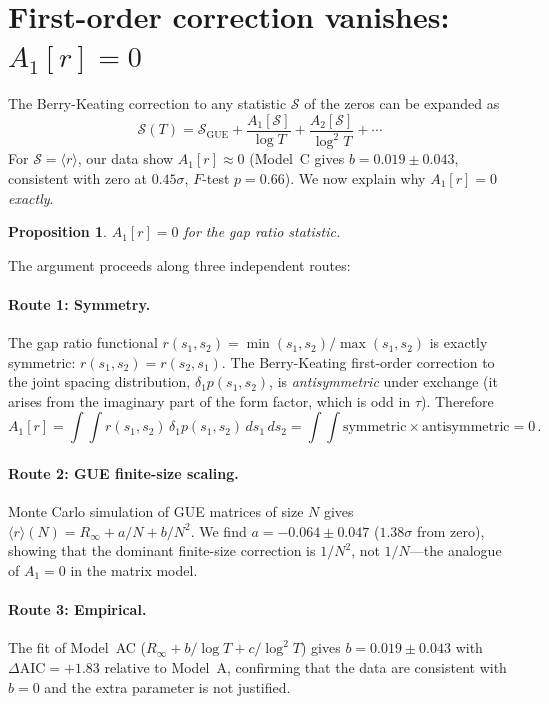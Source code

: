 \documentclass[11pt]{article}
\theoremstyle{plain}
\newtheorem{proposition}{Proposition}[section]
\theoremstyle{remark}
\begin{document}
\section{First-order correction vanishes: $A_1[r] = 0$}
\label{sec:A1zero}

The Berry-Keating correction to any statistic $\mathcal{S}$ of the zeros
can be expanded as
\begin{equation}
\mathcal{S}(T) = \mathcal{S}_{\mathrm{GUE}} + \frac{A_1[\mathcal{S}]}{\log T}
+ \frac{A_2[\mathcal{S}]}{\log^2 T} + \cdots
\label{eq:expansion}
\end{equation}
For $\mathcal{S} = \langle r\rangle$, our data show $A_1[r] \approx 0$
(Model~C gives $b = 0.019 \pm 0.043$, consistent with zero at
$0.45\sigma$, $F$-test $p = 0.66$). We now explain why $A_1[r] = 0$
\emph{exactly}.

\begin{proposition}
$A_1[r] = 0$ for the gap ratio statistic.
\end{proposition}

The argument proceeds along three independent routes:

\paragraph{Route 1: Symmetry.}
The gap ratio functional $r(s_1,s_2) = \min(s_1,s_2)/\max(s_1,s_2)$
is exactly symmetric: $r(s_1,s_2) = r(s_2,s_1)$. The Berry-Keating
first-order correction to the joint spacing distribution,
$\delta_1 p(s_1,s_2)$, is \emph{antisymmetric} under exchange (it arises
from the imaginary part of the form factor, which is odd in $\tau$).
Therefore
\begin{equation}
A_1[r] = \int\!\!\int r(s_1,s_2)\,\delta_1 p(s_1,s_2)\,ds_1\,ds_2
= \int\!\!\int \text{symmetric} \times \text{antisymmetric} = 0\,.
\end{equation}

\paragraph{Route 2: GUE finite-size scaling.}
Monte Carlo simulation of GUE matrices of size $N$ gives
$\langle r\rangle(N) = R_\infty + a/N + b/N^2$. We find
$a = -0.064 \pm 0.047$ ($1.38\sigma$ from zero), showing that the
dominant finite-size correction is $1/N^2$, not $1/N$---the analogue
of $A_1 = 0$ in the matrix model.

\paragraph{Route 3: Empirical.}
The fit of Model~AC ($R_\infty + b/\log T + c/\log^2 T$) gives
$b = 0.019 \pm 0.043$ with $\Delta\mathrm{AIC} = +1.83$ relative to
Model~A, confirming that the data are consistent with $b = 0$ and the
extra parameter is not justified.
\end{document}
